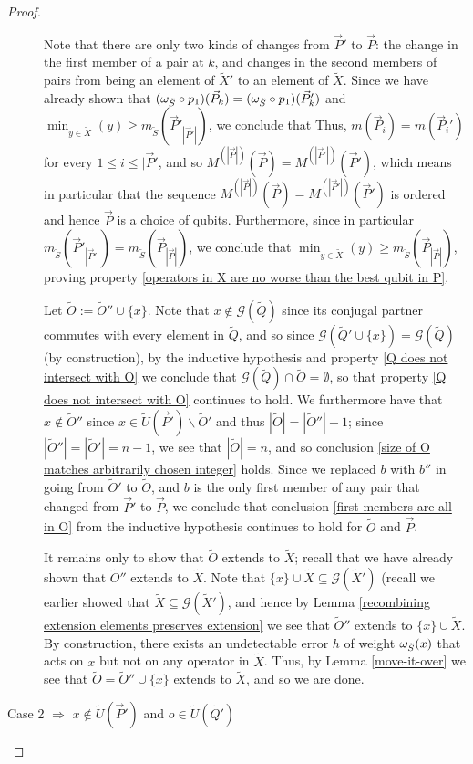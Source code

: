 \documentclass[twocolumn,showpacs,preprintnumbers,amsmath,amssymb,nofootinbib,pra,floatfix]{revtex4-1}
\newcommand{\lst}{\vec}
\newcommand{\set}{\tilde}
\newcommand{\genfun}{\mathcal{G}}
\begin{document}
\begin{proof}
\begin{description}
Note that there are only two kinds of changes from $\lst P'$ to $\lst P$:  the change in the first member of a pair at $k$, and changes in the second members of pairs from being an element of $\set X'$ to an element of $\set X$.  Since we have already shown that $(\om_{\set S}\circ p_1)(\lst P_k) = (\om_{\set S}\circ p_1)(\lst P_k')$ and $\min_{y\in\set X}(y) \ge m_{\set S}(\lst P'_{|\lst P'|})$, we conclude that Thus, $m(\lst P_i)=m(\lst P_i')$ for every $1 \le i \le |\lst P'$, and so $M^{(|\lst P|)}(\lst P)=M^{(|\lst P'|)}(\lst P')$, which means in particular that the sequence $M^{(|\lst P|)}(\lst P)=M^{(|\lst P'|)}(\lst P')$ is ordered and hence $\lst P$ is a choice of qubits.  Furthermore, since in particular $m_{\set S}(\lst P'_{|\lst P'|})=m_{\set S}(\lst P_{|\lst P|})$, we conclude that $\min_{y\in\set X}(y)\geq m_{\set S}(\lst P_{|\lst P|})$, proving property \ref{operators in X are no worse than the best qubit in P}.

Let $\set O:=\set O''\cup\{x\}$.  Note that $x\notin \genfun(\set Q)$ since its conjugal partner commutes with every element in $\set Q$, and so since $\genfun(\set Q'\cup\{x\})=\genfun(\set Q)$ (by construction), by the inductive hypothesis and property \ref{Q does not intersect with O} we conclude that $\genfun(\set Q)\cap\set O=\emptyset$, so that property \ref{Q does not intersect with O} continues to hold.  We furthermore have that $x\notin \set O''$ since $x\in \set U(\lst P')\backslash \set O'$ and thus $|\set O|=|\set O''|+1$;  since $|\set O''|=|\set O'|=n-1$, we see that $|\set O|=n$, and so conclusion \ref{size of O matches arbitrarily chosen integer} holds.  Since we replaced $b$ with $b''$ in going from $\set O'$ to $\set O$, and $b$ is the only first member of any pair that changed from $\lst P'$ to $\lst P$, we conclude that conclusion \ref{first members are all in O} from the inductive hypothesis continues to hold for $\set O$ and $\lst P$.

It remains only to show that $\set O$ extends to $\set X$;  recall that we have already shown that $\set O''$ extends to $\set X$. Note that $\{x\}\cup\set X\subseteq \genfun(\set X')$ (recall we earlier showed that $\set X\subseteq \genfun(\set X')$, and hence by Lemma \ref{recombining extension elements preserves extension} we see that $\set O''$ extends to $\{x\}\cup\set X$.  By construction, there exists an undetectable error $h$ of weight $\om_{\set S}(x)$ that acts on $x$ but not on any operator in $\set X$.  Thus, by Lemma \ref{move-it-over} we see that $\set O=\set O''\cup\{x\}$ extends to $\set X$, and so we are done.
\item[Case 2 $\Rightarrow$ $x\notin \set U(\lst P')$ and $o\in\set U(\set Q')$]


\end{description}
\end{proof}
\end{document}
